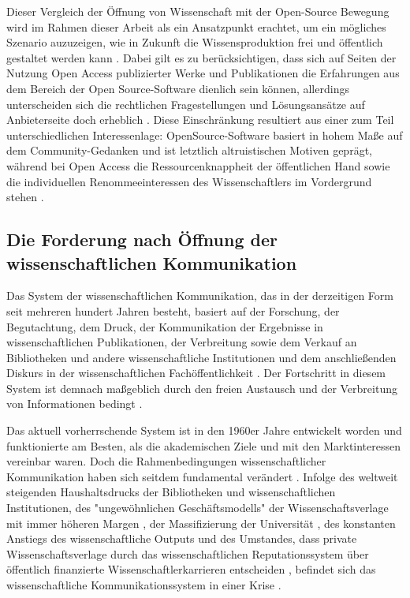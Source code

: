 Dieser Vergleich der Öffnung von Wissenschaft mit der Open-Source Bewegung wird im Rahmen dieser Arbeit als ein Ansatzpunkt erachtet, um ein mögliches Szenario auzuzeigen, wie in Zukunft die Wissensproduktion frei und öffentlich gestaltet werden kann \cite{Kuhlen_2002_universalaccess}. Dabei gilt es zu berücksichtigen, dass sich auf Seiten der Nutzung Open Access publizierter Werke und Publikationen die Erfahrungen aus dem Bereich der Open Source-Software dienlich sein können, allerdings unterscheiden sich die rechtlichen Fragestellungen und Lösungsansätze auf Anbieterseite  doch erheblich \cite{dorschel_2006_open}. Diese Einschränkung resultiert aus einer zum Teil unterschiedlichen Interessenlage: OpenSource-Software basiert in hohem Maße auf dem Community-Gedanken und ist letztlich altruistischen Motiven geprägt, während bei Open Access die Ressourcenknappheit der öffentlichen Hand sowie die individuellen Renommeeinteressen des Wissenschaftlers im Vordergrund stehen \cite{dorschel_2006_open}.

\subsection{Die Forderung nach Öffnung der wissenschaftlichen Kommunikation}

Das System der wissenschaftlichen Kommunikation, das in der derzeitigen Form seit mehreren hundert Jahren besteht, basiert auf der Forschung, der Begutachtung, dem Druck, der Kommunikation der Ergebnisse in wissenschaftlichen Publikationen, der Verbreitung sowie dem Verkauf an Bibliotheken und andere wissenschaftliche Institutionen \cite{cite:11a} und dem anschließenden Diskurs in der wissenschaftlichen Fachöffentlichkeit \cite{bbaw_publizieren_2015}. Der Fortschritt in diesem System ist demnach maßgeblich durch den freien Austausch und der Verbreitung von Informationen bedingt \cite{cite:11}.

Das aktuell vorherrschende System ist in den 1960er Jahre entwickelt worden und funktionierte am Besten, als die akademischen Ziele und mit den Marktinteressen vereinbar waren. Doch die Rahmenbedingungen wissenschaftlicher Kommunikation haben sich seitdem fundamental verändert \cite{epaa_Weiner_2001}. Infolge des weltweit steigenden Haushaltsdrucks der Bibliotheken und wissenschaftlichen Institutionen, des "ungewöhnlichen Geschäftsmodells" \cite{cite:12} der Wissenschaftsverlage mit immer höheren Margen \cite{albert_2006_open_implications}, der Massifizierung der Universität \cite{binswanger_2014_excellence}, des konstanten Anstiegs des wissenschaftliche Outputs \cite[:23]{haustein_2012_multidimensional} und des Umstandes, dass private Wissenschaftsverlage durch das wissenschaftlichen Reputationssystem über öffentlich finanzierte Wissenschaftlerkarrieren entscheiden \cite{heise_2012}, befindet sich das wissenschaftliche Kommunikationssystem in einer Krise \cite{cite:14}.

